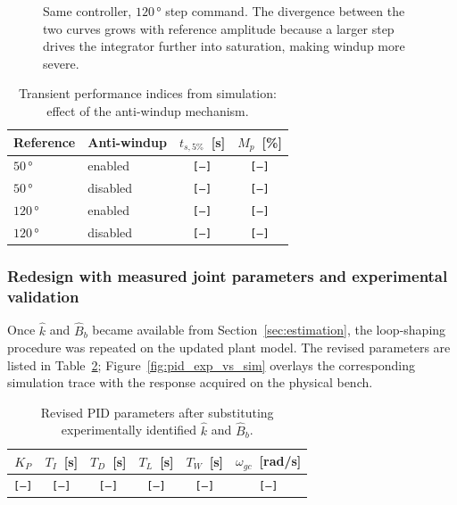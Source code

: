 \documentclass[11pt]{article}
\newcommand{\wgc}{\omega_{gc}}
\begin{document}
\begin{figure}[H]
    \centering
    \caption{Same controller, $120\,\si{\degree}$ step command. The divergence between the
             two curves grows with reference amplitude because a larger step drives the
             integrator further into saturation, making windup more severe.}
    \label{fig:pid_aw_120_sim}
\end{figure}

\begin{table}[H]
\centering
\caption{Transient performance indices from simulation: effect of the anti-windup mechanism.}
\label{tab:pid_perf_sim}
\begin{tabular}{llcc}
\toprule
Reference & Anti-windup & $t_{s,5\%}$~[s] & $M_p$~[\%] \\
\midrule
$50\,\si{\degree}$  & enabled  & \texttt{[---]} & \texttt{[---]} \\
$50\,\si{\degree}$  & disabled & \texttt{[---]} & \texttt{[---]} \\
$120\,\si{\degree}$ & enabled  & \texttt{[---]} & \texttt{[---]} \\
$120\,\si{\degree}$ & disabled & \texttt{[---]} & \texttt{[---]} \\
\bottomrule
\end{tabular}
\end{table}


\subsubsection*{Redesign with measured joint parameters and experimental validation}

Once $\hat{k}$ and $\hat{B}_b$ became available from Section~\ref{sec:estimation}, the
loop-shaping procedure was repeated on the updated plant model.  The revised parameters
are listed in Table~\ref{tab:pid_params_exp}; Figure~\ref{fig:pid_exp_vs_sim} overlays
the corresponding simulation trace with the response acquired on the physical bench.

\begin{table}[H]
\centering
\caption{Revised PID parameters after substituting experimentally identified $\hat{k}$
         and $\hat{B}_b$.}
\label{tab:pid_params_exp}
\begin{tabular}{cccccc}
\toprule
$K_P$ & $T_I$~[s] & $T_D$~[s] & $T_L$~[s] & $T_W$~[s] & $\wgc$~[rad/s] \\
\midrule
\texttt{[---]} & \texttt{[---]} & \texttt{[---]} & \texttt{[---]} & \texttt{[---]} & \texttt{[---]} \\
\bottomrule
\end{tabular}
\end{table}
\end{document}
